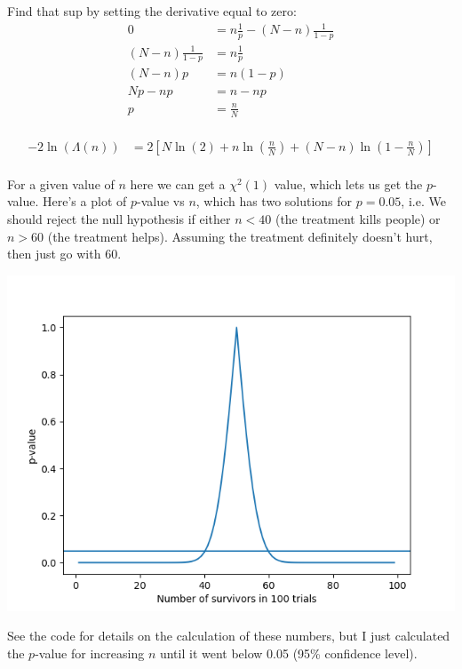 \begin{enumerate}[label=\textbf{\Alph*}.]
    Find that sup by setting the derivative equal to zero:
    \begin{align*}
        0 &= n\frac{1}{p} - (N-n)\frac{1}{1-p} \\
        (N-n)\frac{1}{1-p} &= n\frac{1}{p} \\
        (N-n)p &= n(1-p) \\
        Np-np &= n-np \\
        p &= \frac{n}{N} \\
    \end{align*}


    \begin{align*}
        -2\ln(\Lambda(n)) &= 2\left[N\ln(2) + n\ln(\frac{n}{N}) + (N-n)\ln(1-\frac{n}{N})\right] \\
    \end{align*}

    For a given value of $n$ here we can get a $\chi^2(1)$ value, which lets us get the $p$-value. Here's a plot of $p$-value vs $n$, which has two solutions for $p=0.05$, i.e. We should reject the null hypothesis if either $n < 40$ (the treatment kills people) or $n>60$ (the treatment helps). Assuming the treatment definitely doesn't hurt, then just go with 60.

    \begin{center}
        \includegraphics[width=\textwidth]{q1_a.png}
    \end{center}

    See the code for details on the calculation of these numbers, but I just calculated the $p$-value for increasing $n$ until it went below 0.05 (95\% confidence level).


\end{enumerate}
